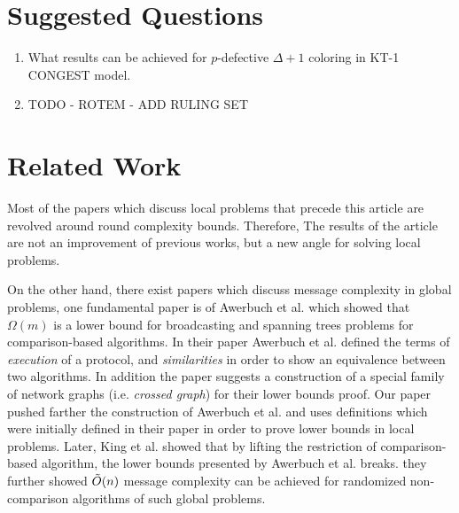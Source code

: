 \documentclass[11pt]{article}
\begin{document}
\section{Suggested Questions}
\begin{enumerate}
    \item What results can be achieved for $p$-defective $\Delta +1$ coloring in KT-1 CONGEST model.
    \item TODO - ROTEM - ADD RULING SET 
    
\end{enumerate}


\section{Related Work}
Most of the papers which discuss local problems that precede this article are revolved around round complexity bounds. Therefore, The results of the article are not an improvement of previous works, but a new angle for solving local problems.

On the other hand, there exist papers which discuss message complexity in global problems, one fundamental paper is of Awerbuch et al.\cite{Awerbuch} which showed that $\Omega(m)$ is a lower bound for broadcasting and spanning trees problems for comparison-based algorithms. In their paper Awerbuch et al. defined the terms of \textit{execution} of a protocol, and \textit{similarities} in order to show an equivalence between two algorithms. In addition the paper suggests a construction of a special family of network graphs (i.e. \textit{crossed graph}) for their lower bounds proof. Our paper pushed farther the construction of Awerbuch et al. and uses definitions which were initially defined in their paper in order to prove lower bounds in local problems.
Later, King et al. \cite{King} showed that by lifting the restriction of comparison-based algorithm, the lower bounds presented by Awerbuch et al. breaks. they further showed $\Tilde{O}(n)$ message complexity can be achieved for randomized non-comparison algorithms of such global problems.
\end{document}

